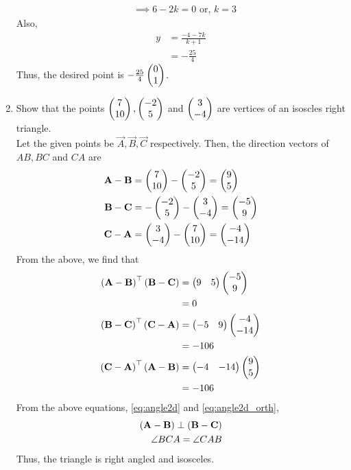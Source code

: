 \documentclass[journal,12pt,twocolumn]{IEEEtran}
\renewcommand\thesection{\arabic{section}}
\begin{document}
\begin{enumerate}[label=\thesection.\arabic*.,ref=\thesection.\theenumi]
\begin{align}
			\\
			&	\implies 6 - 2k = 0 \text{ or, }k = 3
		\end{align}
		Also, 
		\begin{align}
			y &= \frac{-4-7k}{k+1}
			\\
			&=-\frac{25}{4}
		\end{align}
		Thus, the desired point is  $ -\frac{25}{4}
\begin{pmatrix}0 \\ 1 \end{pmatrix}$.
	\item   Show that the points $\begin{pmatrix}7 \\ 10\end{pmatrix}, \begin{pmatrix}-2 \\ 5\end{pmatrix} $ and $\begin{pmatrix}3 \\ -4\end{pmatrix}$ are vertices of an isoscles right triangle.
		\\
		\solution Let the given points be $\vec{A}, \vec{B}, \vec{C}$ respectively. 
Then, the direction vectors of $AB, BC$ and $CA$ are
		\begin{align}
			\mathbf{A} -\mathbf{B}&= \begin{pmatrix}7 \\ 10\end{pmatrix} -\begin{pmatrix}-2 \\ 5\end{pmatrix} = \begin{pmatrix}9 \\ 5\end{pmatrix}
			\\
			\mathbf{B} -\mathbf{C}&=  -\begin{pmatrix}-2 \\ 5\end{pmatrix}-\begin{pmatrix}3 \\ -4\end{pmatrix} = \begin{pmatrix}-5 \\ 9\end{pmatrix}
			\\
			\mathbf{C} -\mathbf{A}&= \begin{pmatrix}3 \\ -4\end{pmatrix} -\begin{pmatrix}7 \\ 10\end{pmatrix} = \begin{pmatrix}-4 \\ -14\end{pmatrix}
		\end{align}
		From the above,  we find that 
		\begin{align}
			\left(\mathbf{A} -\mathbf{B}\right)^{\top}\left(\mathbf{B} -\mathbf{C}\right)&=  \begin{pmatrix}9 & 5\end{pmatrix}\begin{pmatrix}-5 \\ 9\end{pmatrix}
			\\
			&=0
			\\
			\left(\mathbf{B} -\mathbf{C}\right)^{\top}\left(\mathbf{C} -\mathbf{A}\right)&=  \begin{pmatrix}-5 & 9\end{pmatrix}\begin{pmatrix}-4 \\ -14\end{pmatrix}
\\
			&=-106
			\\
			\left(\mathbf{C} -\mathbf{A}\right)^{\top}\left(\mathbf{A} -\mathbf{B}\right)&=  \begin{pmatrix}-4 & -14\end{pmatrix}\begin{pmatrix}9 \\ 5\end{pmatrix}
\\
			&=-106
		\end{align}
		From  the above equations, 
    \eqref{eq:angle2d} and 
    \eqref{eq:angle2d_orth},
		\begin{align}
			\left(\mathbf{A} -\mathbf{B}\right)\perp \left(\mathbf{B} -\mathbf{C}\right)
			\\
			\angle BCA = 
			\angle CAB  
		\end{align}
		Thus, the triangle is right angled and isosceles.
\end{enumerate}
\end{document}

